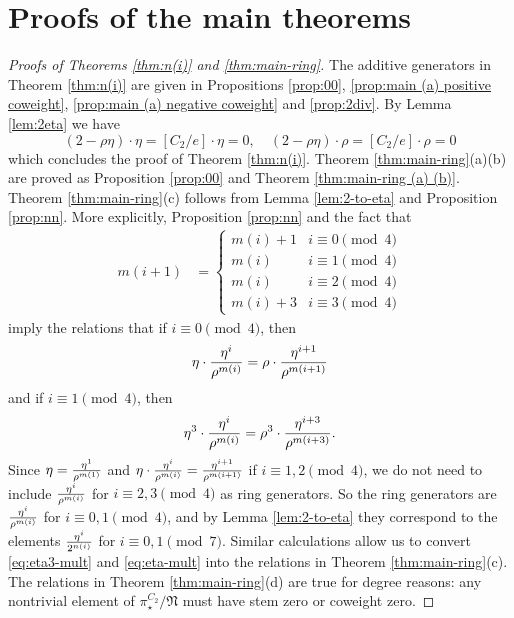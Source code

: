 \documentclass[psamsfonts]{amsart}
\newcommand{\fN}{\mathfrak N}
\theoremstyle{definition}
\theoremstyle{remark}
\numberwithin{equation}{section}
\begin{document}
\section{Proofs of the main theorems} \label{sec:proofs}

\begin{proof}[Proofs of Theorems \ref{thm:n(i)} and
\ref{thm:main-ring}]
The additive generators in Theorem \ref{thm:n(i)} are given in Propositions \ref{prop:00}, \ref{prop:main (a) positive coweight}, \ref{prop:main (a) negative coweight} and \ref{prop:2div}. By Lemma \ref{lem:2eta} we have
\[(2-\rho\eta)\cdot \eta=[C_2/e]\cdot \eta=0,\quad (2-\rho\eta)\cdot \rho=[C_2/e]\cdot \rho=0\]
which concludes the proof of Theorem \ref{thm:n(i)}.
Theorem \ref{thm:main-ring}(a)(b) are proved as
Proposition \ref{prop:00} and Theorem \ref{thm:main-ring (a) (b)}. Theorem
\ref{thm:main-ring}(c) follows from Lemma \ref{lem:2-to-eta} and Proposition \ref{prop:nn}. More explicitly, Proposition \ref{prop:nn} and the fact that \begin{align*}
m(i+1) & =
\begin{cases} 
	m(i) + 1 &  i\equiv 0\pmod 4
	\\m(i) & i\equiv 1\pmod 4
	\\m(i) & i\equiv 2\pmod 4
	\\m(i) + 3 & i\equiv 3\pmod 4
\end{cases}
\end{align*}
imply the relations that
if $i\equiv 0\pmod 4$, then
	\begin{equation}\label{eq:eta3-mult} \eta\cdot {\eta^i\over \rho^{m(i)}} = \rho \cdot {\eta^{i+1}\over \rho^{m(i+1)}} \end{equation}
    and if $i\equiv 1\pmod 4$, then
	\begin{equation}\label{eq:eta-mult} \eta^3 \cdot {\eta^i\over \rho^{m(i)}} = \rho^3 \cdot {\eta^{i+3}\over \rho^{m(i+3)}}. \end{equation}
Since $\eta = {\eta^1\over
\rho^{m(1)}}$ and $\eta \cdot {\eta^i\over \rho^{m(i)}} = {\eta^{i+1}\over
\rho^{m(i+1)}}$ if $i\equiv 1,2\pmod 4$, we do not need to include ${\eta^i\over \rho^{m(i)}}$ for
$i\equiv 2,3\pmod 4$ as ring generators. So the ring generators are $\eta^i\over \rho^{m(i)}$ for $i\equiv 0,1\pmod 4$, and by Lemma \ref{lem:2-to-eta} they correspond to the elements ${\eta^i\over 2^{n(i)}}$ for $i\equiv 0,1\pmod 7$.
Similar calculations allow us to convert \eqref{eq:eta3-mult} and \eqref{eq:eta-mult} into the relations in Theorem \ref{thm:main-ring}(c).
The relations in Theorem \ref{thm:main-ring}(d) are true for degree
reasons: any nontrivial element of $\pi_\star^{C_2}/\fN$ must have stem zero or
coweight zero.

\end{proof}
\end{document}
